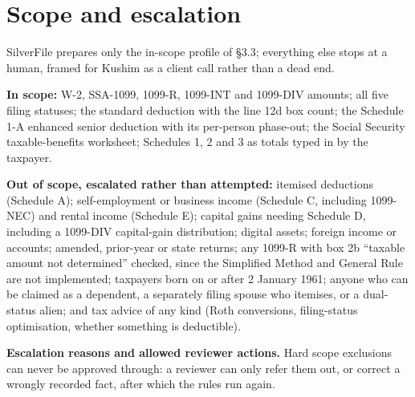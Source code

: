 \documentclass[9pt]{extarticle}
\begin{document}
\section{Scope and escalation}

SilverFile prepares only the in-scope profile of \S3.3; everything else stops at a human, framed for Kushim as a client call rather than a dead end.

\textbf{In scope:} W-2, SSA-1099, 1099-R, 1099-INT and 1099-DIV amounts; all five filing statuses; the standard deduction with the line 12d box count; the Schedule 1-A enhanced senior deduction with its per-person phase-out; the Social Security taxable-benefits worksheet; Schedules 1, 2 and 3 as totals typed in by the taxpayer.

\textbf{Out of scope, escalated rather than attempted:} itemised deductions (Schedule A); self-employment or business income (Schedule C, including 1099-NEC) and rental income (Schedule E); capital gains needing Schedule D, including a 1099-DIV capital-gain distribution; digital assets; foreign income or accounts; amended, prior-year or state returns; any 1099-R with box 2b ``taxable amount not determined'' checked, since the Simplified Method and General Rule are not implemented; taxpayers born on or after 2 January 1961; anyone who can be claimed as a dependent, a separately filing spouse who itemises, or a dual-status alien; and tax advice of any kind (Roth conversions, filing-status optimisation, whether something is deductible).

\textbf{Escalation reasons and allowed reviewer actions.} Hard scope exclusions can never be approved through: a reviewer can only refer them out, or correct a wrongly recorded fact, after which the rules run again.
\end{document}
